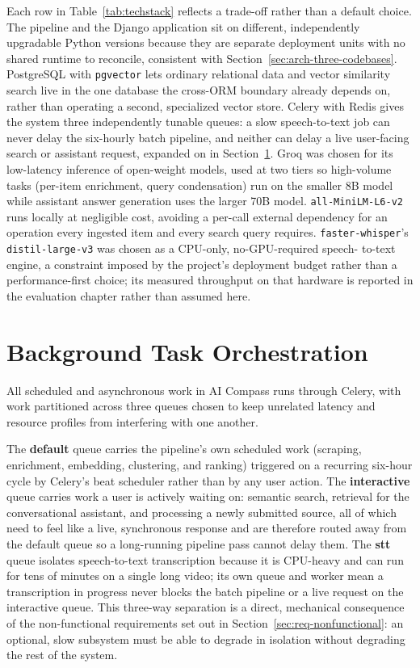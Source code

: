 Each row in Table~\ref{tab:techstack} reflects a trade-off rather than a
default choice. The pipeline and the Django application sit on different,
independently upgradable Python versions because they are separate
deployment units with no shared runtime to reconcile, consistent with
Section~\ref{sec:arch-three-codebases}. PostgreSQL with \texttt{pgvector}
lets ordinary relational data and vector similarity search live in the one
database the cross-ORM boundary already depends on, rather than operating
a second, specialized vector store. Celery with Redis gives the system
three independently tunable queues: a slow speech-to-text job can never
delay the six-hourly batch pipeline, and neither can delay a live
user-facing search or assistant request, expanded on in
Section~\ref{sec:arch-task-orchestration}. Groq was chosen for its
low-latency inference of open-weight models, used at two tiers so
high-volume tasks (per-item enrichment, query condensation) run on the
smaller 8B model while assistant answer generation uses the larger 70B
model. \texttt{all-MiniLM-L6-v2} runs locally at negligible cost, avoiding
a per-call external dependency for an operation every ingested item and
every search query requires. \texttt{faster-whisper}'s
\texttt{distil-large-v3} was chosen as a CPU-only, no-GPU-required speech-
to-text engine, a constraint imposed by the project's deployment budget
rather than a performance-first choice; its measured throughput on that
hardware is reported in the evaluation chapter rather than assumed here.

\section{Background Task Orchestration}
\label{sec:arch-task-orchestration}

All scheduled and asynchronous work in AI Compass runs through Celery, with
work partitioned across three queues chosen to keep unrelated latency and
resource profiles from interfering with one another.

The \textbf{default} queue carries the pipeline's own scheduled work
(scraping, enrichment, embedding, clustering, and ranking) triggered on a
recurring six-hour cycle by Celery's beat scheduler rather than by any user
action. The \textbf{interactive} queue carries work a user is actively
waiting on: semantic search, retrieval for the conversational assistant,
and processing a newly submitted source, all of which need to feel like a
live, synchronous response and are therefore routed away from the default
queue so a long-running pipeline pass cannot delay them. The
\textbf{stt} queue isolates speech-to-text transcription because it is
CPU-heavy and can run for tens of minutes on a single long video; its own
queue and worker mean a transcription in progress never blocks the batch
pipeline or a live request on the interactive queue. This three-way
separation is a direct, mechanical consequence of the non-functional
requirements set out in Section~\ref{sec:req-nonfunctional}: an optional,
slow subsystem must be able to degrade in isolation without degrading the
rest of the system.
